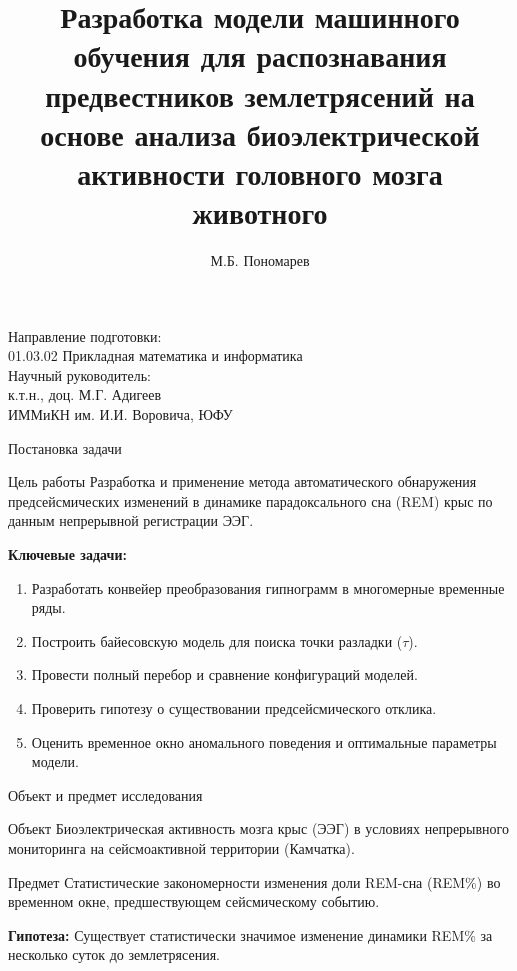 \documentclass[12pt,aspectratio=169]{beamer}
\title[АДМ]{ Разработка модели машинного обучения для распознавания предвестников землетрясений на основе анализа биоэлектрической активности головного мозга животного}
\author[М.Б. Пономарев]{М.Б. Пономарев}
\institute[ИММиКН ЮФУ]{}
\date[2026]{}
\begin{document}
	
	\begin{frame}
		\titlepage
		\vspace{-1.cm}
		\begin{flushright}
			\small
			Направление подготовки: \\
			01.03.02 Прикладная математика и информатика \\
			Научный руководитель:\\ к.т.н., доц. М.Г. Адигеев\\
			ИММиКН им. И.И. Воровича, ЮФУ
		\end{flushright}
	\end{frame}
	
	\begin{frame}{Постановка задачи}
		\begin{block}{Цель работы}
			Разработка и применение метода автоматического обнаружения предсейсмических изменений в динамике парадоксального сна (REM) крыс по данным непрерывной регистрации ЭЭГ.
		\end{block}
		
		\vspace{0.3cm}
		\textbf{Ключевые задачи:}
		\begin{enumerate}
			\item Разработать конвейер преобразования гипнограмм в многомерные временные ряды.
			\item Построить байесовскую модель для поиска точки разладки ($\tau$).
			\item Провести полный перебор и сравнение конфигураций моделей.
			\item Проверить гипотезу о существовании предсейсмического отклика.
			\item Оценить временное окно аномального поведения и оптимальные параметры модели.
		\end{enumerate}
	\end{frame}
	
	\begin{frame}{Объект и предмет исследования}
		\begin{block}{Объект}
			Биоэлектрическая активность мозга крыс (ЭЭГ) в условиях непрерывного мониторинга на сейсмоактивной территории (Камчатка).
		\end{block}
		
		\vspace{0.3cm}
		\begin{block}{Предмет}
			Статистические закономерности изменения доли REM-сна (REM\%) во временном окне, предшествующем сейсмическому событию.
		\end{block}
		
		\vspace{0.3cm}
		\begin{center}
			\textbf{Гипотеза:} Существует статистически значимое изменение динамики REM\% за несколько суток до землетрясения.
		\end{center}
	\end{frame}
	
\end{document}
